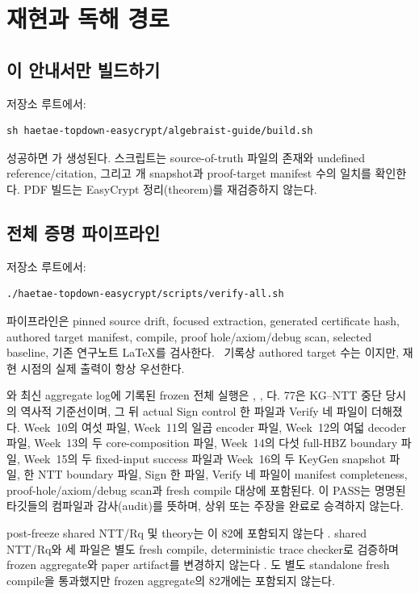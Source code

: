 \section{재현과 독해 경로}
\label{sec:reproduction}

\subsection{이 안내서만 빌드하기}

저장소 루트에서:
\begin{verbatim}
sh haetae-topdown-easycrypt/algebraist-guide/build.sh
\end{verbatim}
성공하면 가
생성된다. 스크립트는 source-of-truth 파일의 존재와 undefined
reference/citation, 그리고 \AuthoredTargetCount 개 snapshot과 proof-target
manifest 수의 일치를 확인한다. PDF 빌드는 EasyCrypt 정리(theorem)를 재검증하지
않는다.

\subsection{전체 증명 파이프라인}

저장소 루트에서:
\begin{verbatim}
./haetae-topdown-easycrypt/scripts/verify-all.sh
\end{verbatim}
파이프라인은 pinned source drift, focused extraction, generated certificate hash,
authored target manifest,  compile, proof hole/axiom/debug scan,
selected baseline, 기존 연구노트 LaTeX를 검사한다. \SnapshotWeek\ 기록상 authored
target 수는 \AuthoredTargetCount 이지만, 재현 시점의 실제 출력이 항상 우선한다.

\begin{verified}
와 최신 aggregate log에 기록된 frozen 전체 실행은
 , ,
다. 77은 KG--NTT 중단 당시의 역사적 기준선이며,
그 뒤 actual Sign control 한 파일과 Verify 네 파일이 더해졌다.
Week~10의 여섯 파일, Week~11의 일곱 encoder 파일,
Week~12의 여덟 decoder 파일, Week~13의 두 core-composition 파일, Week~14의 다섯
full-HBZ boundary 파일, Week~15의 두 fixed-input success 파일과 Week~16의 두
KeyGen snapshot 파일, 한 NTT boundary 파일, Sign 한 파일, Verify 네 파일이
manifest completeness, proof-hole/axiom/debug scan과 fresh compile 대상에
포함된다. 이 PASS는 명명된
타깃들의 컴파일과 감사(audit)를 뜻하며,
상위 \statuspartial 또는 \statusblocked 주장을 완료로 승격하지 않는다.

post-freeze shared NTT/Rq 및  theory는 이 82에 포함되지
않는다 \cite{paper-freeze-artifacts}. shared NTT/Rq와 세
 파일은 별도 fresh compile, deterministic trace
checker로 검증하며 frozen aggregate와 paper artifact를 변경하지 않는다
\cite{post-freeze-kg-rq-haetae-report,
post-freeze-kg-actual-avec-qj-report}.
도 별도 standalone fresh compile을
통과했지만 frozen aggregate의 82개에는 포함되지 않는다.
\end{verified}

